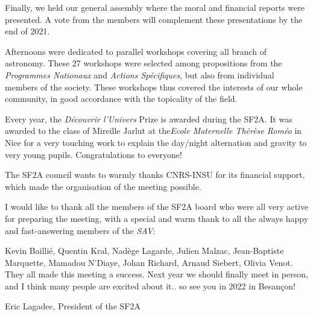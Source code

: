Finally, we held our general assembly where the moral and financial reports were presented. A vote from the members will complement these presentations by the end of 2021.


Afternoons were dedicated to parallel workshops covering all branch of astronomy. These 27 workshops were selected among propositions from the \emph{Programmes Nationaux} and \emph{Actions Sp\'ecifiques}, but also from individual members of the society. These workshops thus covered the interests of our whole community, in good accordance with the topicality of the field.


Every year, the \emph{Découvrir l'Univers} Prize is awarded during the SF2A. It was awarded to the class of Mireille Jarlut at the\emph{Ecole Maternelle Thérèse Roméo} in Nice for a very touching work to explain the day/night alternation and gravity to very young pupils. Congratulations to everyone!

The SF2A council wants to warmly thanks CNRS-INSU for its financial support, which made the organisation of the meeting possible. 

I would like to thank all the members of the SF2A board who were all very active for preparing the meeting, with a special and warm thank to all the always happy and fast-answering members of the \emph{SAV}:

Kevin Baillié, Quentin Kral, Nadège Lagarde, Julien Malzac, Jean-Baptiste Marquette, Mamadou N'Diaye,  Johan Richard, Arnaud Siebert, Olivia Venot.
They all made this meeting a success. 
%
Next year we should finally meet in person, and I think many people are excited about it.. so see you in 2022 in Besançon!


\begin{center}
Eric Lagadec, 
President of the SF2A 
\end{center}


%
